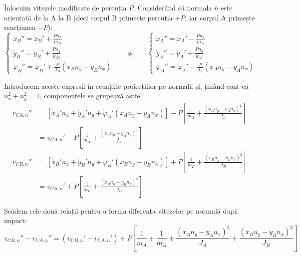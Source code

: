 \documentclass[12pt, a4paper]{article}
\begin{document}
Înlocuim vitezele modificate de percuția $P$. Considerând că normala $\bar{n}$ este orientată de la A la B (deci corpul B primește percuția $+P$, iar corpul A primește reacțiunea $-P$):
\begin{equation}
    \begin{cases}
        \dot{x}_B'' = \dot{x}_B' + \frac{P n_x}{m_B} \\
        \dot{y}_B'' = \dot{y}_B' + \frac{P n_y}{m_B} \\
        \dot{\varphi}_B'' = \dot{\varphi}_B' + \frac{P}{J_B}(x_B n_y - y_B n_x)
    \end{cases}
    \qquad \text{și} \qquad
    \begin{cases}
        \dot{x}_A'' = \dot{x}_A' - \frac{P n_x}{m_A} \\
        \dot{y}_A'' = \dot{y}_A' - \frac{P n_y}{m_A} \\
        \dot{\varphi}_A'' = \dot{\varphi}_A' - \frac{P}{J_A}(x_A n_y - y_A n_x)
    \end{cases}
\end{equation}

Introducem aceste expresii în ecuațiile proiecțiilor pe normală și, ținând cont că $n_x^2 + n_y^2 = 1$, componentele se grupează astfel:
\begin{equation}
    \begin{aligned}
        v_{CA,n}'' &= \left[ \dot{x}_A' n_x + \dot{y}_A' n_y + \dot{\varphi}_A'(x_A n_y - y_A n_x) \right] - P \left[ \frac{1}{m_A} + \frac{(x_A n_y - y_A n_x)^2}{J_A} \right] \\
                   &= v_{CA,n}' - P \left[ \frac{1}{m_A} + \frac{(x_A n_y - y_A n_x)^2}{J_A} \right] \\
        v_{CB,n}'' &= \left[ \dot{x}_B' n_x + \dot{y}_B' n_y + \dot{\varphi}_B'(x_B n_y - y_B n_x) \right] + P \left[ \frac{1}{m_B} + \frac{(x_B n_y - y_B n_x)^2}{J_B} \right] \\
                   &= v_{CB,n}' + P \left[ \frac{1}{m_B} + \frac{(x_B n_y - y_B n_x)^2}{J_B} \right]
    \end{aligned}
\end{equation}

Scădem cele două relații pentru a forma diferența vitezelor pe normală după impact:
\begin{equation}
    v_{CB,n}'' - v_{CA,n}'' = (v_{CB,n}' - v_{CA,n}') + P \left[ \frac{1}{m_A} + \frac{1}{m_B} + \frac{(x_A n_y - y_A n_x)^2}{J_A} + \frac{(x_B n_y - y_B n_x)^2}{J_B} \right]
\end{equation}
\end{document}
